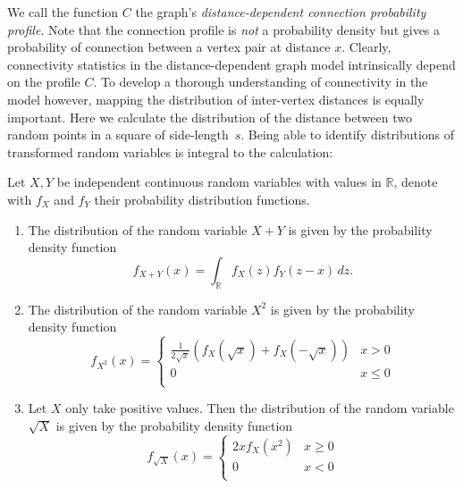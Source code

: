 We call the function $C$ the graph's \textit{distance-dependent
  connection probability profile}.
Note that the connection profile is \textit{not} a probability
density but gives a probability of connection between a vertex pair
at distance $x$. 
Clearly, connectivity statistics in the distance-dependent graph model
intrinsically depend on the profile $C$. To develop a thorough
understanding of connectivity in the model however, mapping the
distribution of inter-vertex distances is equally important. Here we
calculate the distribution of the distance between two random points
in a square of side-length~$s$. Being able to identify distributions
of transformed random variables is integral to the calculation:

\begin{lemma} \label{lemma:transform_random_variable} 
  Let $X,Y$ be independent continuous random variables with values in
  $\mathbb{R}$, denote with $f_X$ and $f_Y$ their probability
  distribution functions.%
  \begin{enumerate}[label=(\arabic*),ref=(\arabic*), itemsep=-0.6cm]
    \item The distribution of the random variable $X+Y$ is given by
      the probability density function%
      \[%
        f_{X+Y}(x) = \int_{\mathbb{R}} f_X(z) f_Y(z-x)\, dz.  
      \]%
    \item The distribution of the random variable $X^2$ is given by
      the probability density function
      \[
        f_{X^2}(x) = %
        \begin{cases} 
          \frac{1}{2\sqrt{x}}\left(f_X(\sqrt{x})+f_X(-\sqrt{x})\right)
           & x > 0 \\           0     & x \leq 0 \\
        \end{cases}
      \]
    \item Let $X$ only take positive values. Then the distribution of
      the random variable $\sqrt{X}$ is given by the probability
      density function
      \[
        f_{\sqrt{X}}(x) = %
        \begin{cases}
          2x f_X(x^2) & x \geq 0 \\0   & x < 0 \\
        \end{cases}
      \]
  \end{enumerate}
\end{lemma}

